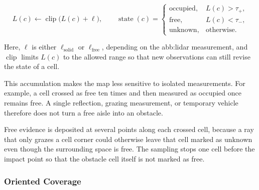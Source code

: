\begin{equation}
    L(c) \leftarrow \operatorname{clip}\bigl(L(c)+\ell\bigr),
    \qquad
    \operatorname{state}(c)=
    \begin{cases}
        \mathrm{occupied}, & L(c)>\tau_{+},   \\[2pt]
        \mathrm{free},     & L(c)<\tau_{-},   \\[2pt]
        \mathrm{unknown},  & \text{otherwise}.
    \end{cases}
    \label{eq:sys:occupancy}
\end{equation}

Here, $\ell$ is either $\ell_{\mathrm{solid}}$ or $\ell_{\mathrm{free}}$,
depending on the \gls{abb:lidar} measurement, and $\operatorname{clip}$ limits
$L(c)$ to the allowed range so that new observations can still revise the state
of a cell.

This accumulation makes the map less sensitive to isolated measurements. For
example, a cell crossed as free ten times and then measured as occupied once
remains free. A single reflection, grazing measurement, or temporary vehicle
therefore does not turn a free aisle into an obstacle.

Free evidence is deposited at several points along each crossed cell, because a
ray that only grazes a cell corner could otherwise leave that cell marked as
unknown even though the surrounding space is free. The sampling stops one cell
before the impact point so that the obstacle cell itself is not marked as free.

\begin{algorithm}[!htb]
    \caption{IntegrateRevolution}%
    \label{algo:sys:integrate}
\end{algorithm}

\FloatBarrier

\subsubsection*{Oriented Coverage}

